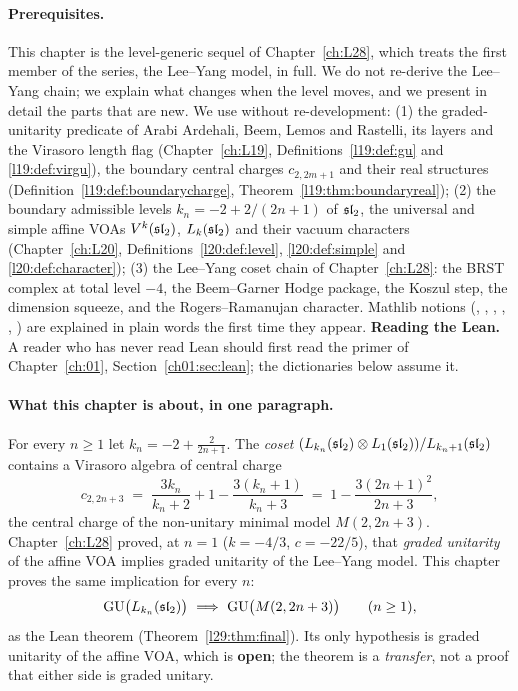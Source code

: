 \paragraph{Prerequisites.} This chapter is the level-generic sequel of Chapter~\ref{ch:L28}, which treats the
first member of the series, the Lee--Yang model, in full. We do not re-derive the Lee--Yang chain; we explain what
changes when the level moves, and we present in detail the parts that are new. We use without re-development:
(1) the graded-unitarity predicate of Arabi Ardehali, Beem, Lemos and Rastelli, its layers and the Virasoro length
flag (Chapter~\ref{ch:L19}, Definitions~\ref{l19:def:gu} and \ref{l19:def:virgu}), the boundary central charges
$c_{2,2m+1}$ and their real structures (Definition~\ref{l19:def:boundarycharge}, Theorem~\ref{l19:thm:boundaryreal});
(2) the boundary admissible levels $k_n=-2+2/(2n+1)$ of $\mathfrak{sl}_2$, the universal and simple affine VOAs
$V^k(\mathfrak{sl}_2)$, $L_k(\mathfrak{sl}_2)$ and their vacuum characters (Chapter~\ref{ch:L20},
Definitions~\ref{l20:def:level}, \ref{l20:def:simple} and \ref{l20:def:character}); (3) the Lee--Yang coset chain of
Chapter~\ref{ch:L28}: the BRST complex at total level $-4$, the Beem--Garner Hodge package, the Koszul step, the
dimension squeeze, and the Rogers--Ramanujan character. Mathlib notions (, ,
, , , ) are explained in plain words the
first time they appear. \textbf{Reading the Lean.} A reader who has never read Lean should first read the primer of
Chapter~\ref{ch:01}, Section~\ref{ch01:sec:lean}; the dictionaries below assume it.

\paragraph{What this chapter is about, in one paragraph.} For every $n\ge1$ let $k_n=-2+\frac{2}{2n+1}$. The
\emph{coset} $(L_{k_n}(\mathfrak{sl}_2)\otimes L_1(\mathfrak{sl}_2))/L_{k_n+1}(\mathfrak{sl}_2)$ contains a Virasoro
algebra of central charge
\begin{equation}\label{l29:eq:charge}
c_{2,2n+3}\;=\;\frac{3k_n}{k_n+2}+1-\frac{3(k_n+1)}{k_n+3}\;=\;1-\frac{3(2n+1)^2}{2n+3},
\end{equation}
the central charge of the non-unitary minimal model $M(2,2n+3)$. Chapter~\ref{ch:L28} proved, at $n=1$
($k=-4/3$, $c=-22/5$), that \emph{graded unitarity} of the affine VOA implies graded unitarity of the Lee--Yang model.
This chapter proves the same implication for every $n$:
\begin{equation}\label{l29:eq:headline}
\ltwentynineGU\bigl(L_{k_n}(\ltwentyninesl)\bigr)\ \Longrightarrow\ \ltwentynineGU\bigl(M(2,2n+3)\bigr)\qquad(n\ge1),
\end{equation}
as the Lean theorem 
(Theorem~\ref{l29:thm:final}). Its only hypothesis is graded unitarity of the affine VOA, which is \textbf{open}; the
theorem is a \emph{transfer}, not a proof that either side is graded unitary.

